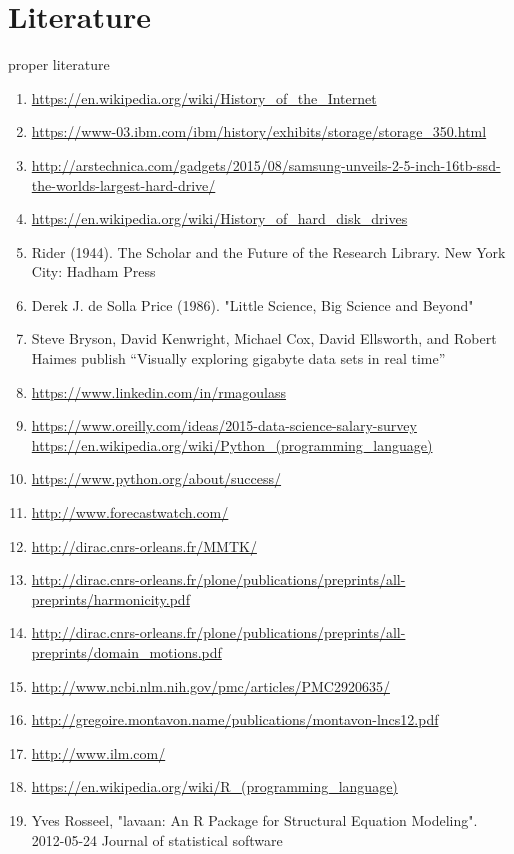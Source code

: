 \documentclass[
  twoside,
  11pt, a4paper,
  footinclude=true,
  headinclude=true,
  cleardoublepage=empty
]{scrreprt}
\begin{document}
\section{Literature}
proper literature
\begin{enumerate}
    \item \url{https://en.wikipedia.org/wiki/History_of_the_Internet} 
    \item \url{https://www-03.ibm.com/ibm/history/exhibits/storage/storage_350.html}
    \item \url{http://arstechnica.com/gadgets/2015/08/samsung-unveils-2-5-inch-16tb-ssd-the-worlds-largest-hard-drive/}
    \item \url{https://en.wikipedia.org/wiki/History_of_hard_disk_drives}
    \item Rider (1944). The Scholar and the Future of the Research Library. New York City: Hadham Press
    \item Derek J. de Solla Price (1986). "Little Science, Big Science and Beyond"
    \item  Steve Bryson, David Kenwright, Michael Cox, David Ellsworth, and Robert Haimes publish “Visually exploring gigabyte data sets in real time”
    \item \url{https://www.linkedin.com/in/rmagoulass}
    \item \url{https://www.oreilly.com/ideas/2015-data-science-salary-survey}
    \ietm \url{https://en.wikipedia.org/wiki/Python_(programming_language)}
    \item \url{https://www.python.org/about/success/}
    \item \url{http://www.forecastwatch.com/}
    \item \url{http://dirac.cnrs-orleans.fr/MMTK/}
    \item \url{http://dirac.cnrs-orleans.fr/plone/publications/preprints/all-preprints/harmonicity.pdf}
    \item \url{http://dirac.cnrs-orleans.fr/plone/publications/preprints/all-preprints/domain_motions.pdf}
    \item \url{http://www.ncbi.nlm.nih.gov/pmc/articles/PMC2920635/}
    \item \url{http://gregoire.montavon.name/publications/montavon-lncs12.pdf}
    \item \url{http://www.ilm.com/}
    \item \url{https://en.wikipedia.org/wiki/R_(programming_language)}
    \item Yves Rosseel, "lavaan: An R Package for Structural Equation Modeling". 2012-05-24 Journal of statistical software

\end{enumerate}
\end{document}
